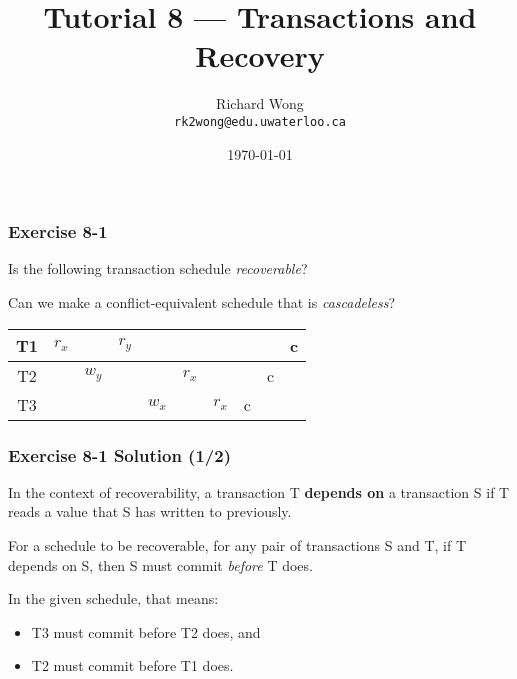 

\def\ojoin{\setbox0=\hbox{$\bowtie$}%
  \rule[-.02ex]{.25em}{.4pt}\llap{\rule[\ht0]{.25em}{.4pt}}}
\def\leftouterjoin{\mathbin{\ojoin\mkern-5.8mu\bowtie}}

\title{Tutorial 8 --- Transactions and Recovery }

\author{Richard Wong \\ \small \texttt{rk2wong@edu.uwaterloo.ca}}
\date{\today}




\begin{frame}
  \titlepage

\end{frame}


\begin{frame}
\frametitle{Exercise 8-1}

Is the following transaction schedule \textit{recoverable}?

Can we make a conflict-equivalent schedule that is \textit{cascadeless}?

\begin{center}
\begin{tabular}{ c c c c c c c c c c }
  \hline
  T1 & $r_x$ & & $r_y$ & & & & & & c \\
  \hline
  T2 & & $w_y$ & & & $r_x$ & & & c & \\
  \hline
  T3 & & & & $w_x$ & & $r_x$ & c & & \\
  \hline
\end{tabular}
\end{center}

\end{frame}


\begin{frame}
\frametitle{Exercise 8-1 Solution (1/2)}

In the context of recoverability, a transaction T \textbf{depends on} a transaction S if T reads a value that S has written to previously.

For a schedule to be recoverable, for any pair of transactions S and T, if T depends on S, then S must commit \textit{before} T does.

In the given schedule, that means:

\begin{itemize}
  \item T3 must commit before T2 does, and
  \item T2 must commit before T1 does.
\end{itemize}

\end{frame}


